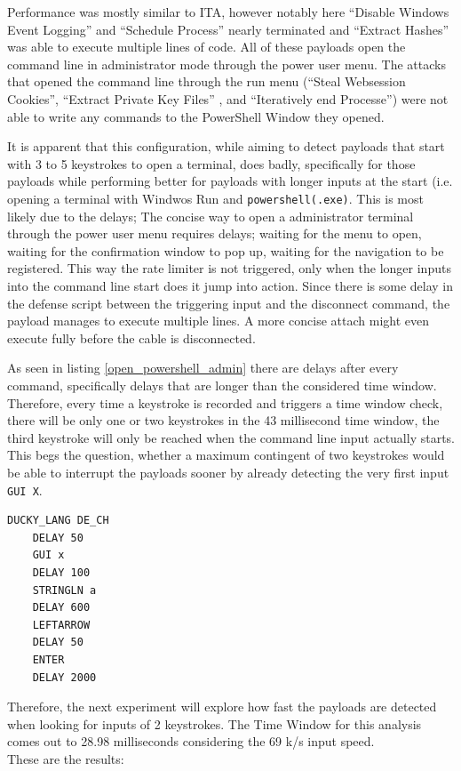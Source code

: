 Performance was mostly similar to ITA, however notably here ``Disable Windows Event Logging'' and ``Schedule Process'' nearly terminated and ``Extract Hashes'' was able to execute multiple lines of code. All of these payloads open the command line in administrator mode through the power user menu. 
The attacks that opened the command line through the run menu (``Steal Websession Cookies'', ``Extract Private Key Files'' , and ``Iteratively end Processe'')  were not able to write any commands to the PowerShell Window they opened. 

It is apparent that this configuration, while aiming to detect payloads that start with 3 to 5 keystrokes to open a terminal, does badly, specifically for those payloads while performing better for payloads with longer inputs at the start (i.e. opening a terminal with Windwos Run and \verb|powershell(.exe)|. This is most likely due to the delays; The concise way to open a administrator terminal through the power user menu requires delays; waiting for the menu to open, waiting for the confirmation window to pop up, waiting for the navigation to be registered. This way the rate limiter is not triggered, only when the longer inputs into the command line start does it jump into action. Since there is some delay in the defense script between the triggering input and the disconnect command, the payload manages to execute multiple lines.  A more concise attach might even execute fully before the cable is disconnected. 

As seen in listing \ref{open_powershell_admin} there are delays after every command, specifically delays that are longer than the considered time window. Therefore, every time a keystroke is recorded and triggers a time window check, there will be only one or two keystrokes in the 43 millisecond time window, the third keystroke will only be reached when the command line input actually starts. This begs the question, whether a maximum contingent of two keystrokes would be able to interrupt the payloads sooner by already detecting the very first input \verb|GUI X|. 

\begin{lstlisting}[caption={First 10 lines of ``Schedule Job'' Payload},label=lst:open_powershell_admin, captionpos=b]
    DUCKY_LANG DE_CH
    DELAY 50
    GUI x
    DELAY 100
    STRINGLN a
    DELAY 600
    LEFTARROW
    DELAY 50
    ENTER
    DELAY 2000
\end{lstlisting}

Therefore, the next experiment will explore how fast the payloads are detected when looking for inputs of 2 keystrokes. The Time Window for this analysis comes out to 28.98 milliseconds considering the 69 k/s input speed.\\
These are the results:


